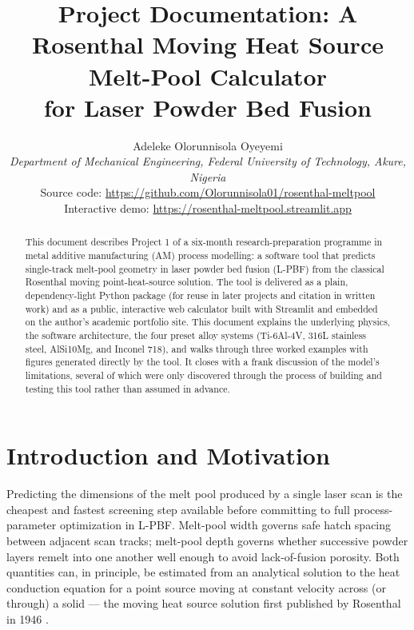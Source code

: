\documentclass[10pt,journal]{IEEEtran}
\begin{document}
\title{Project Documentation: A Rosenthal Moving Heat Source Melt-Pool Calculator\\
\large for Laser Powder Bed Fusion}

\author{Adeleke Olorunnisola Oyeyemi\\
\textit{Department of Mechanical Engineering, Federal University of Technology, Akure, Nigeria}\\
Source code: \url{https://github.com/Olorunnisola01/rosenthal-meltpool}\\
Interactive demo: \url{https://rosenthal-meltpool.streamlit.app}}


\maketitle

\begin{abstract}
This document describes Project 1 of a six-month research-preparation programme in metal additive manufacturing (AM) process modelling: a software tool that predicts single-track melt-pool geometry in laser powder bed fusion (L-PBF) from the classical Rosenthal moving point-heat-source solution. The tool is delivered as a plain, dependency-light Python package (for reuse in later projects and citation in written work) and as a public, interactive web calculator built with Streamlit and embedded on the author's academic portfolio site. This document explains the underlying physics, the software architecture, the four preset alloy systems (Ti-6Al-4V, 316L stainless steel, AlSi10Mg, and Inconel 718), and walks through three worked examples with figures generated directly by the tool. It closes with a frank discussion of the model's limitations, several of which were only discovered through the process of building and testing this tool rather than assumed in advance.
\end{abstract}

\section{Introduction and Motivation}

Predicting the dimensions of the melt pool produced by a single laser scan is the cheapest and fastest screening step available before committing to full process-parameter optimization in L-PBF. Melt-pool width governs safe hatch spacing between adjacent scan tracks; melt-pool depth governs whether successive powder layers remelt into one another well enough to avoid lack-of-fusion porosity. Both quantities can, in principle, be estimated from an analytical solution to the heat conduction equation for a point source moving at constant velocity across (or through) a solid --- the moving heat source solution first published by Rosenthal in 1946 \cite{rosenthal1946}.
\end{document}
